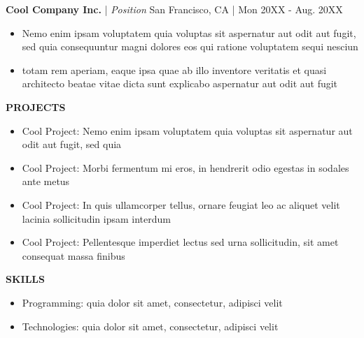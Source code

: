 \documentclass[letterpaper,9pt]{article}
\newcommand{\organization}[4]{
    \vspace{1.5pt}

    \textbf{#1} | \emph{#3} \hfill{#4 | #2}

    \vspace{14pt}
}
\newcommand{\skills}[2]{
    \vspace{-2pt} 
    \bulletsBeginn
        \item Programming: \hspace{14pt} #1
        \item Technologies: \hspace{17pt} #2
    \bulletsEndd
    \vspace{4pt}
}
\newcommand{\bulletsBegin}{
    \vspace{-8pt}
    \begin{minipage}{16.5cm} 
    \begin{itemize}[leftmargin=0.6cm]
    \setlength\itemsep{-0.05em}
}
\newcommand{\bulletsEnd}{
    \end{itemize}\vspace{0pt}
    \end{minipage}
}
\newcommand{\bulletsBeginn}{
    \vspace{1pt}
    \begin{minipage}{17.5cm} 
    \begin{itemize}[leftmargin=0.5cm]
    \setlength\itemsep{-0.05em}
}
\newcommand{\bulletsEndd}{
    \end{itemize}\vspace{0pt}
    \end{minipage}
}
\newcommand{\resumeSection}[1]{
    \vspace{8pt}
    \hspace{15pt} \textbf{\color{bluee}#1}
    \vspace{2pt}
}
\begin{document}
\begin{siderules}[style=burgundyline]
            \organization{Cool Company Inc.}{Mon 20XX - Aug. 20XX}
            {Position}{San Francisco, CA}
            \bulletsBegin
                \item Nemo enim ipsam voluptatem quia voluptas sit aspernatur aut odit aut fugit, sed quia consequuntur magni dolores eos qui ratione voluptatem sequi nesciun
                \item totam rem aperiam, eaque ipsa quae ab illo inventore veritatis et quasi architecto beatae vitae dicta sunt explicabo aspernatur aut odit aut fugit
            \bulletsEnd
        
            \vspace{-12pt}  
        \end{siderules}


    

    
    \resumeSection{PROJECTS}
    
    \begin{siderules}[style=burgundyline]
        \vspace{-6pt}
        
            \bulletsBeginn
                \item Cool Project:       \hspace{20pt} Nemo enim ipsam voluptatem quia voluptas sit aspernatur aut odit aut fugit, sed quia 
                \item Cool Project:       \hspace{20pt} Morbi fermentum mi eros, in hendrerit odio egestas in sodales ante metus
                \item Cool Project:       \hspace{20pt} In quis ullamcorper tellus, ornare feugiat leo ac aliquet velit lacinia sollicitudin ipsam interdum
                \item Cool Project:       \hspace{20pt} Pellentesque imperdiet lectus sed urna sollicitudin, sit amet consequat massa finibus
            \bulletsEndd

        \vspace{-12pt}
    \end{siderules}

    \resumeSection{SKILLS}
    \begin{siderules}[style=burgundyline]
        \vspace{-5pt}
        \skills
            {quia dolor sit amet, consectetur, adipisci velit}
            {quia dolor sit amet, consectetur, adipisci velit}
        \vspace{-19pt}
    \end{siderules}
\end{document}
